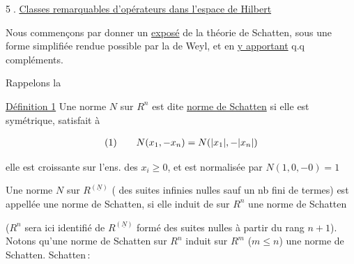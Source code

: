 
\textcircled{5.} \uline{Classes remarquables d'opérateurs dans l'espace de Hilbert}

Nous commençons par donner un {\color{red}\uline{\color{black}exposé}} de la théorie de Schatten,  sous une forme simplifiée rendue possible par la  de Weyl, et en {\color{red}\uline{\color{black}y apportant}} q.q  compléments.

{\reversemarginpar{}}

 Rappelons la

{\reversemarginpar{}}
\uline{Définition 1}  Une norme $N$ sur $R^n$ est dite \uline{norme de Schatten} si elle est symétrique, satisfait à


\[
\begin{array}{@{}l@{\qquad}l@{}}
(1)&\displaystyle N(x_1,\mathord{-}x_n)=N(|x_1|,\mathord{-}|x_n|)
\end{array}
\]

  elle est croissante  sur l'ens. des $x_i\geq 0$, et  est normalisée par $N(1,0,\mathord{-}0)=1$

Une norme $N$ sur $R^{(\underline N)}$  ( des suites infinies  nulles sauf un nb fini de termes) est appellée une norme de Schatten, si  elle induit  de sur $R^n$ une norme de Schatten

($R^n$ sera ici identifié  de $R^{(\underline N)}$ formé des suites nulles à partir du rang $n+1$). Notons qu'une norme de Schatten sur $R^n$ induit sur $R^m$ ($m\leq n$) une norme de Schatten.  Schatten\,:

